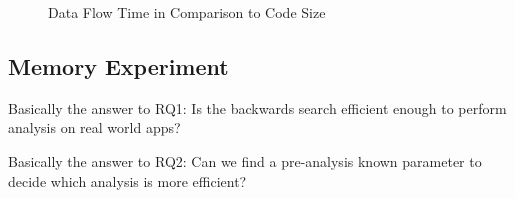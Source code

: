 \documentclass[../draft.tex]{subfiles}
\begin{document}
    \begin{figure}
        \centering
        \begin{subfigure}[b]{\textwidth}
            \centering
            \begin{subfigure}[]{0.45\textwidth}
                \centering
                \resizebox{\columnwidth}{!}{
                    
                }
            \end{subfigure}
            \qquad
            \begin{subfigure}[]{0.45\textwidth}
                \centering
                \resizebox{\columnwidth}{!}{
                    
                }
            \end{subfigure}
        \end{subfigure}
        \bigbreak
        \begin{subfigure}[b]{\textwidth}
            \centering
            \begin{subfigure}[]{0.45\textwidth}
                \centering
                \resizebox{\columnwidth}{!}{
                    
                }
            \end{subfigure}
            \qquad
            \begin{subfigure}[]{0.45\textwidth}
                \centering
                \resizebox{\columnwidth}{!}{
                    
                }
            \end{subfigure}
        \end{subfigure}
        \bigbreak
        \begin{subfigure}[b]{\textwidth}
            \centering
            \begin{subfigure}[]{0.45\textwidth}
                \centering
                \resizebox{\columnwidth}{!}{
                    
                }
            \end{subfigure}
            \qquad
            \begin{subfigure}[]{0.45\textwidth}
                \centering
                \resizebox{\columnwidth}{!}{
                    
                }
            \end{subfigure}
        \end{subfigure}
        \caption{Data Flow Time in Comparison to Code Size}
        \label{f:dftocodesize}
    \end{figure}


    \subsection{Memory Experiment}
    Basically the answer to RQ1: Is the backwards search efficient enough to perform analysis on real world apps?


    Basically the answer to RQ2: Can we find a pre-analysis known parameter to decide which analysis is more efficient?
\end{document}
